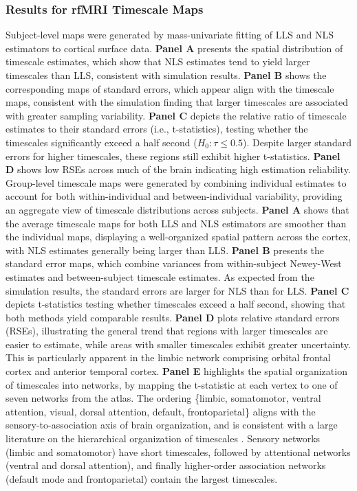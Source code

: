 \documentclass[latex/main.tex]{subfiles}
\begin{document}
\subsubsection{Results for rfMRI Timescale Maps}
Subject-level maps were generated by mass-univariate fitting of LLS and NLS estimators to cortical surface data. \textbf{Panel A} presents the spatial distribution of timescale estimates, which show that NLS estimates tend to yield larger timescales than LLS, consistent with simulation results. \textbf{Panel B} shows the corresponding maps of standard errors, which appear align with the timescale maps, consistent with the simulation finding that larger timescales are associated with greater sampling variability. \textbf{Panel C} depicts the relative ratio of timescale estimates to their standard errors (i.e., t-statistics), testing whether the timescales significantly exceed a half second ($H_0: \tau \leq 0.5$). Despite larger standard errors for higher timescales, these regions still exhibit higher t-statistics. \textbf{Panel D} shows low RSEs across much of the brain indicating high estimation reliability. \\

Group-level timescale maps were generated by combining individual estimates to account for both within-individual and between-individual variability, providing an aggregate view of timescale distributions across subjects. \textbf{Panel A} shows that the average timescale maps for both LLS and NLS estimators are smoother than the individual maps, displaying a well-organized spatial pattern across the cortex, with NLS estimates generally being larger than LLS. \textbf{Panel B} presents the standard error maps, which combine variances from within-subject Newey-West estimates and between-subject timescale estimates. As expected from the simulation results, the standard errors are larger for NLS than for LLS. \textbf{Panel C} depicts t-statistics testing whether timescales exceed a half second, showing that both methods yield comparable results. \textbf{Panel D} plots relative standard errors (RSEs), illustrating the general trend that regions with larger timescales are easier to estimate, while areas with smaller timescales exhibit greater uncertainty. This is particularly apparent in the limbic network comprising orbital frontal cortex and anterior temporal cortex. \textbf{Panel E} highlights the spatial organization of timescales into networks, by mapping the t-statistic at each vertex to one of seven networks from the \citet{thomas_yeo_organization_2011} atlas. The ordering \{limbic, somatomotor, ventral attention, visual, dorsal attention, default, frontoparietal\} aligns with the sensory-to-association axis of brain organization, and is consistent with a large literature on the hierarchical organization of timescales \citep{murray_hierarchy_2014, hasson_hierarchy_2008, stephens_place_2013, raut_hierarchical_2020, gao_neuronal_2020, hasson_hierarchy_2008}. Sensory networks (limbic and somatomotor) have short timescales, followed by attentional networks (ventral and dorsal attention), and finally higher-order association networks (default mode and frontoparietal) contain the largest timescales.\\ 
\end{document}
